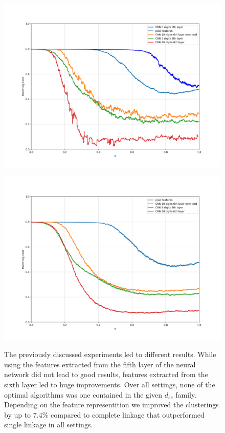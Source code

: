 \begin{figure}[h]
\centering
\begin{minipage}{.45\textwidth}
  \centering
  {\includegraphics[width=\linewidth]{plots/mnist_overview}}
\end{minipage}\quad
\begin{minipage}{.45\textwidth}
  \centering
  {\includegraphics[width=\linewidth]{plots/mnist_overview_random}}
\end{minipage}
\caption{%
  The previously discussed experiments led to different results. While using the features extracted from the fifth layer of the neural network did not lead to good results, features extracted from the sixth layer led to huge improvements. Over all settings, none of the optimal algorithms was one contained in the given $d_{sc}$ family. Depending on the feature representition we improved the clusterings by up to $7.4\%$ compared to complete linkage that outperformed single linkage in all settings.}
\label{fig:mnist_overview}
\end{figure}

